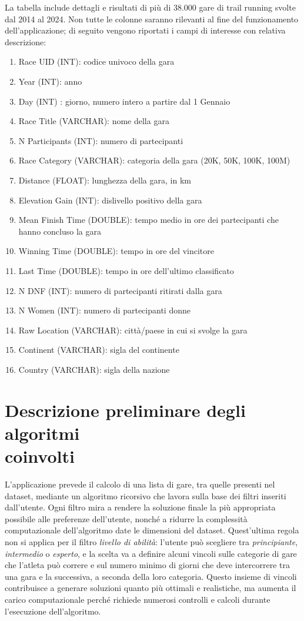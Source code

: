\documentclass[a4paper, 12pt, oneside]{book}
\begin{document}
La tabella include dettagli e risultati di più di 38.000 gare di trail running svolte dal 2014 al 2024. Non tutte le colonne saranno rilevanti al fine del funzionamento dell'applicazione; di seguito vengono riportati i campi di interesse con relativa descrizione:
\begin{enumerate}
    \item Race UID (INT): codice univoco della gara
    \item Year (INT): anno
    \item Day (INT) : giorno, numero intero a partire dal 1 Gennaio
    \item Race Title (VARCHAR): nome della gara
    \item N Participants (INT): numero di partecipanti
    \item Race Category (VARCHAR): categoria della gara (20K, 50K, 100K, 100M)
    \item Distance (FLOAT): lunghezza della gara, in km
    \item Elevation Gain (INT): dislivello positivo della gara
    \item Mean Finish Time (DOUBLE): tempo medio in ore dei partecipanti che hanno concluso la gara
    \item Winning Time (DOUBLE): tempo in ore del vincitore
    \item Last Time (DOUBLE): tempo in ore dell'ultimo classificato
    \item N DNF (INT): numero di partecipanti ritirati dalla gara
    \item N Women (INT): numero di partecipanti donne
    \item Raw Location (VARCHAR): città/paese in cui si svolge la gara
    \item Continent (VARCHAR): sigla del continente
    \item Country (VARCHAR): sigla della nazione
\end{enumerate} 

\section[Descrizione preliminare degli algoritmi coinvolti]{Descrizione preliminare degli algoritmi \\ coinvolti} \label{sec:algoritmi-coinvolti}
L'applicazione prevede il calcolo di una lista di gare, tra quelle presenti nel dataset, mediante un algoritmo ricorsivo che lavora sulla base dei filtri inseriti dall'utente. Ogni filtro mira a rendere la soluzione finale la più appropriata possibile alle preferenze dell'utente, nonché a ridurre la complessità computazionale dell'algoritmo date le dimensioni del dataset. Quest'ultima regola non si applica per il filtro \textit{livello di abilità}: l'utente può scegliere tra \textit{principiante}, \textit{intermedio} o \textit{esperto}, e la scelta va a definire alcuni vincoli sulle categorie di gare che l'atleta può correre e sul numero minimo di giorni che deve intercorrere tra una gara e la successiva, a seconda della loro categoria. Questo insieme di vincoli contribuisce a generare soluzioni quanto più ottimali e realistiche, ma aumenta il carico computazionale perché richiede numerosi controlli e calcoli durante l'esecuzione dell'algoritmo.
\end{document}

